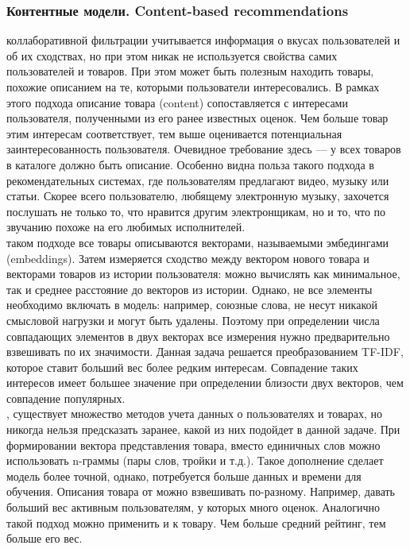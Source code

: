 \documentclass{article}
\newcommand\tab[1][1cm]{\hspace*{#1}}
\begin{document}
\subsubsection{Контентные модели. Content-based recommendations}
 коллаборативной фильтрации учитывается информация о вкусах пользователей и об их сходствах, но при этом никак не используется свойства самих пользователей и товаров. При этом может быть полезным находить товары, похожие описанием на те, которыми пользователи интересовались. В рамках этого подхода описание товара (content) сопоставляется с интересами пользователя, полученными из его ранее известных оценок. Чем больше товар этим интересам соответствует, тем выше оценивается потенциальная заинтересованность пользователя. Очевидное требование здесь — у всех товаров в каталоге должно быть описание. Особенно видна польза такого подхода в рекомендательных системах, где пользователям предлагают видео, музыку или статьи. Скорее всего пользователю, любящему электронную музыку, захочется послушать не только то, что нравится другим электронщикам, но и то, что по звучанию похоже на его любимых исполнителей. \\
 таком подходе все товары описываются векторами, называемыми эмбедингами (embeddings). Затем измеряется сходство между вектором нового товара и векторами товаров из истории пользователя: можно вычислять как минимальное, так и среднее расстояние до векторов из истории. Однако, не все элементы необходимо включать в модель: например, союзные слова, не несут никакой смысловой нагрузки и могут быть удалены. Поэтому при определении числа совпадающих элементов в двух векторах все измерения нужно предварительно взвешивать по их значимости. Данная задача решается преобразованием TF-IDF, которое ставит больший вес более редким интересам. Совпадение таких интересов имеет большее значение при определении близости двух векторов, чем совпадение популярных.\\
, существует множество методов учета данных о пользователях и товарах, но никогда нельзя предсказать заранее, какой из них подойдет в данной задаче. При формировании вектора представления товара, вместо единичных слов можно использовать n-граммы (пары слов, тройки и т.д.). Такое дополнение сделает модель более точной, однако, потребуется больше данных и времени для обучения. Описания товара от можно взвешивать по-разному. Например, давать больший вес активным пользователям, у которых много оценок. Аналогично такой подход можно применить и к товару. Чем больше средний рейтинг, тем больше его вес.
\end{document}
